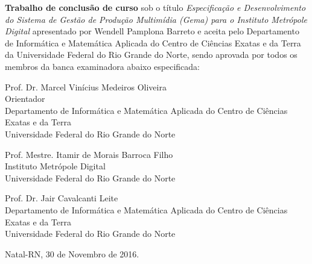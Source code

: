 \begin{folhadeaprovacao}
	\setlength{\ABNTsignthickness}{0.4pt}
	\setlength{\ABNTsignwidth}{10cm}
	
	\noindent 
	\textbf{Trabalho de conclusão de curso} sob o título \textit{Especificação e Desenvolvimento do Sistema de Gestão de Produção Multimídia (Gema) para o Instituto Metrópole Digital} apresentado por 
	Wendell Pamplona Barreto e aceita pelo Departamento de Informática e Matemática Aplicada do
	Centro de Ciências Exatas e da Terra da Universidade Federal do Rio Grande do Norte,
	sendo aprovada por todos os membros da banca examinadora abaixo especificada:
		
	\assinatura
	{
		Prof. Dr. Marcel Vinícius Medeiros Oliveira\\
		{\small Orientador} 															\\ 
		{\footnotesize
			Departamento de Informática e Matemática Aplicada do Centro de Ciências Exatas e da Terra \\
			Universidade Federal do Rio Grande do Norte
		}
	}
	
	\assinatura
	{
		Prof. Mestre. Itamir de Morais Barroca Filho						\\
		{\footnotesize
			Instituto Metrópole Digital \\
			Universidade Federal do Rio Grande do Norte
		}
	}
		
	\assinatura
	{
		Prof. Dr. Jair Cavalcanti Leite					 \\ 
		{\footnotesize
			Departamento de Informática e Matemática Aplicada do Centro de Ciências Exatas e da Terra \\
			Universidade Federal do Rio Grande do Norte
		}
	}
	\vfill
	
	\begin{center}
		Natal-RN, 30 de Novembro de 2016.
	\end{center}
\end{folhadeaprovacao}